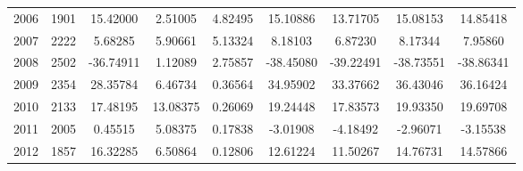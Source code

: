 \begin{tabularx}{1\textwidth}{lcSSSSSSS}
	2006 & 1901 & 15.42000 & 2.51005 & 4.82495 & 15.10886 & 13.71705 & 15.08153 & 14.85418 \\ 
	2007 & 2222 & 5.68285 & 5.90661 & 5.13324 & 8.18103 & 6.87230 & 8.17344 & 7.95860 \\ 
	2008 & 2502 & -36.74911 & 1.12089 & 2.75857 & -38.45080 & -39.22491 & -38.73551 & -38.86341 \\ 
	2009 & 2354 & 28.35784 & 6.46734 & 0.36564 & 34.95902 & 33.37662 & 36.43046 & 36.16424 \\ 
	2010 & 2133 & 17.48195 & 13.08375 & 0.26069 & 19.24448 & 17.83573 & 19.93350 & 19.69708 \\ 
	2011 & 2005 & 0.45515 & 5.08375 & 0.17838 & -3.01908 & -4.18492 & -2.96071 & -3.15538 \\ 
	2012 & 1857 & 16.32285 & 6.50864 & 0.12806 & 12.61224 & 11.50267 & 14.76731 & 14.57866 \\ 
	\bottomrule
\end{tabularx}